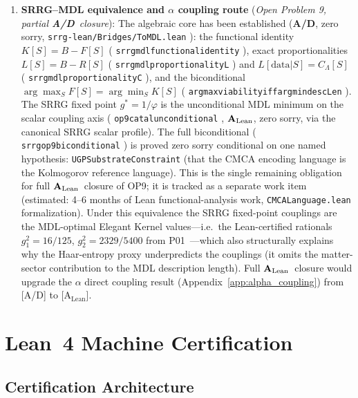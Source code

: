\documentclass[11pt]{article}
\theoremstyle{remark}
\newcommand{\CatAL}{\ensuremath{\textbf{A}_{\rm Lean}}}
\newcommand{\CatAD}{\textbf{A/D}}
\newcommand{\lean}[1]{%
  \penalty-100
  \begingroup
  \def\_{\textunderscore\allowbreak}%
  \texttt{#1}%
  \endgroup
}
\begin{document}
\begin{enumerate}[leftmargin=2.5em]
\item \textbf{SRRG--MDL equivalence and $\alpha$ coupling route} (\emph{Open Problem 9,
  partial \CatAD\ closure}): The algebraic core has been established (\CatAD, zero sorry,
  \lean{srrg-lean/Bridges/ToMDL.lean}): the functional identity $K[S] = B - F[S]$
  (\lean{srrg\_mdl\_functional\_identity}), exact proportionalities
  $L[S] = B - R[S]$ (\lean{srrg\_mdl\_proportionality\_L}) and
  $L[\text{data}|S] = C_\Lambda[S]$ (\lean{srrg\_mdl\_proportionality\_C}),
  and the biconditional $\arg\max_S F[S] = \arg\min_S K[S]$
  (\lean{argmax\_viability\_iff\_argmin\_descLen}).
  The SRRG fixed point $g^* = 1/\varphi$ is the unconditional MDL minimum on the
  scalar coupling axis (\lean{op9\_catal\_unconditional}, \CatAL, zero sorry, via the
  canonical SRRG scalar profile).
  The full biconditional (\lean{srrg\_op9\_biconditional}) is proved zero sorry
  conditional on one named hypothesis: \lean{UGPSubstrateConstraint} (that the CMCA
  encoding language is the Kolmogorov reference language).  This is the single
  remaining obligation for full \CatAL\ closure of OP9; it is tracked as a separate
  work item (estimated: 4--6 months of Lean functional-analysis work,
  \lean{CMCALanguage.lean} formalization).
  Under this equivalence the SRRG fixed-point couplings are the MDL-optimal
  Elegant Kernel values---i.e.\ the Lean-certified rationals $g_1^2 = 16/125$,
  $g_2^2 = 2329/5400$ from P01~\cite{Spivack2025_FirstPrinciplesSM}---which also
  structurally explains why the Haar-entropy proxy underpredicts the couplings
  (it omits the matter-sector contribution to the MDL description length).
  Full \CatAL\ closure would upgrade the $\alpha$ direct coupling result
  (Appendix~\ref{app:alpha_coupling}) from [A/D] to [A$_{\mathrm{Lean}}$].
\end{enumerate}


\clearpage
\section{Lean~4 Machine Certification}
\label{sec:lean}

\subsection{Certification Architecture}
\label{sec:cert_arch}
\end{document}
